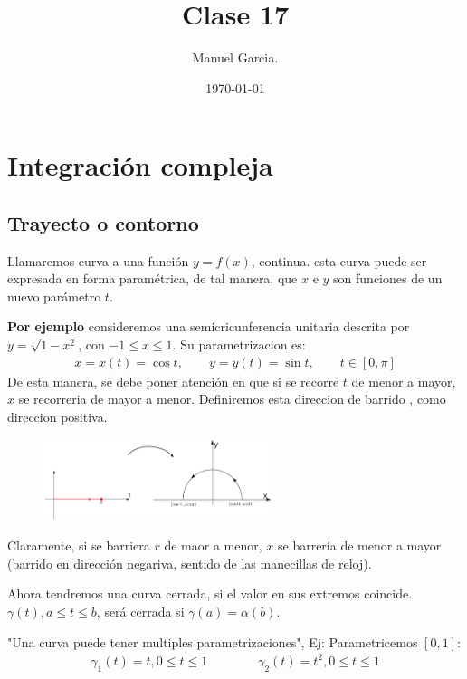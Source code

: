 \documentclass{article}
\title{Clase 17 }
\author{Manuel Garcia.}
\date{\today}
\begin{document}
\maketitle

\section{Integración compleja }
\subsection{Trayecto o contorno }
Llamaremos curva a una función $ y = f(x)  $, continua. esta curva puede ser expresada en forma paramétrica, de tal manera, que $ x  $ e $ y  $ son funciones de un nuevo parámetro $ t  $. 

\textbf{Por ejemplo } consideremos una semicricunferencia unitaria descrita por $ y = \sqrt{1 - x ^2}  $, con $ -1 \leq x \leq 1  $. Su parametrizacion es: 
\begin{gather*}
  x  = x(t)= \cos{t }, \qquad y = y(t) = \sin{t }, \qquad t \in [0,\pi ] 
\end{gather*}
De esta manera, se debe poner atención en que si se recorre $ t  $ de menor a mayor, $ x  $ se recorreria de mayor a menor. Definiremos esta direccion de barrido , como direccion positiva.
\begin{figure}[H]
  \begin{center}
    \includegraphics[width=0.6\textwidth]{contorno_integracion.png}
  \end{center}
\end{figure}
Claramente, si se barriera $ r  $ de maor a menor, $ x  $ se barrería de menor a mayor (barrido en dirección negariva, sentido de las manecillas de reloj).

Ahora tendremos una curva cerrada, si el valor en sus extremos coincide. $ \gamma(t), a \leq t \leq b  $, será cerrada si $ \gamma(a) = \alpha(b)  $.

"Una curva puede tener multiples parametrizaciones", Ej: Parametricemos $ [0,1] $: 
\begin{gather*}
  \gamma_1(t) = t, 0 \leq t \leq 1 \qquad \qquad \gamma_2 (t) = t ^2, 0\leq t \leq 1 
\end{gather*}
\end{document}
